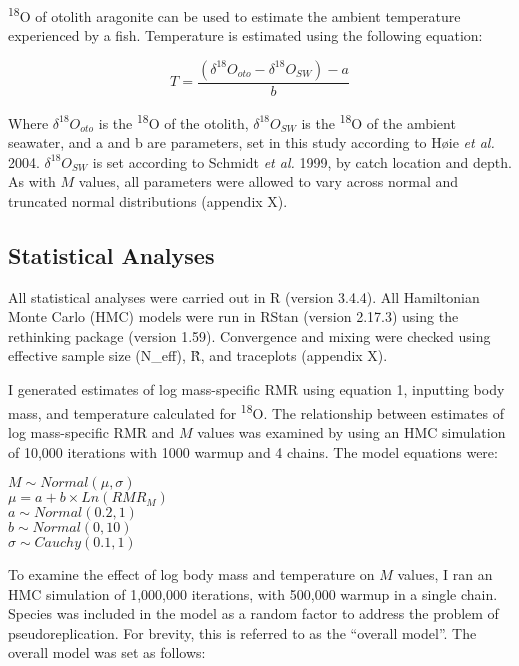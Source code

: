 \documentclass[12pt, titlepage]{article}
\begin{document}
\textdelta \textsuperscript{18}O of otolith aragonite can be used to estimate the ambient temperature experienced by a fish. %
Temperature is estimated using the following equation:

\begin{equation}
T = \frac{(\delta^{18}O_{oto} - \delta^{18}O_{SW}) - a}{b}
\end{equation}

\noindent Where $\delta^{18}O_{oto}$ is the \textdelta \textsuperscript{18}O of the otolith, $\delta^{18}O_{SW}$ is the \textdelta \textsuperscript{18}O of the ambient seawater, and a and b are parameters, set in this study according to H{\o}ie \textit{et al.} 2004. $\delta^{18}O_{SW}$  is set according to Schmidt \textit{et al.} 1999, by catch location and depth. 
As with $M$ values, all parameters were allowed to vary across normal and truncated normal distributions (appendix X). %

\subsection{Statistical Analyses}

All statistical analyses were carried out in R (version 3.4.4). All Hamiltonian Monte Carlo (HMC) models were run in RStan (version 2.17.3) using the rethinking package (version 1.59). Convergence and mixing were checked using effective sample size (N\_eff), \^R, and traceplots (appendix X).

I generated estimates of log mass-specific RMR using equation 1, inputting body mass, and temperature calculated for \textdelta \textsuperscript{18}O.
The relationship between estimates of log mass-specific RMR and $M$ values was examined by using an HMC simulation of 10,000 iterations with 1000 warmup and 4 chains.
The model equations were:

\begin{center}
$M \sim Normal(\mu, \sigma)$
\\$\mu = a + b \times Ln(RMR_{M})$
\\$a \sim Normal(0.2, 1)$
\\$b \sim Normal(0, 10)$
\\$\sigma \sim Cauchy(0.1, 1)$
\end{center}

To examine the effect of log body mass and temperature on $M$ values, I ran an HMC simulation of 1,000,000 iterations, with 500,000 warmup in a single chain. 
Species was included in the model as a random factor to address the problem of pseudoreplication. 
For brevity, this is referred to as the ``overall model''. 
The overall model was set as follows:
\end{document}
